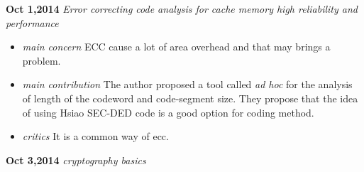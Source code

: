 \documentclass[]{article}
\begin{document}
\noindent \textbf{Oct 1,2014}
\textit{Error correcting code analysis for cache memory high reliability and performance}
\indent		\begin{itemize}
            \item \textit{main concern} ECC cause a lot of area overhead and that may brings a problem.
            \item \textit{main contribution} The author proposed a tool called \textit{ad hoc} for the analysis of 
            length of the codeword and code-segment size. They propose that the idea of using Hsiao SEC-DED code is
            a good option for coding method.
            \item \textit{critics} It is a common way of ecc.
            \end{itemize}

\noindent \textbf{Oct 3,2014}
\textit{cryptography basics} \\
\indent	
            	
\end{document}

